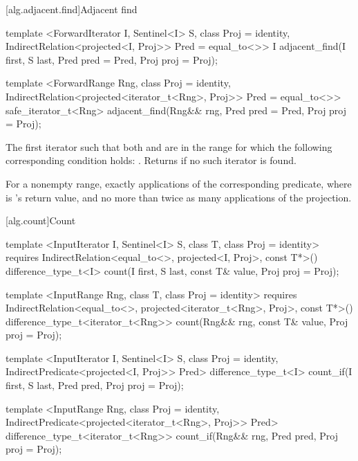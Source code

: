 [alg.adjacent.find]{Adjacent find}

%
\begin{itemdecl}
template <ForwardIterator I, Sentinel<I> S, class Proj = identity,
    IndirectRelation<projected<I, Proj>> Pred = equal_to<>>
  I
    adjacent_find(I first, S last, Pred pred = Pred{},
                  Proj proj = Proj{});

template <ForwardRange Rng, class Proj = identity,
    IndirectRelation<projected<iterator_t<Rng>, Proj>> Pred = equal_to<>>
  safe_iterator_t<Rng>
    adjacent_find(Rng&& rng, Pred pred = Pred{}, Proj proj = Proj{});
\end{itemdecl}

\begin{itemdescr}
\pnum
\returns
The first iterator
such that both
and
are in
the range
for which
the following corresponding condition holds:
.
Returns 
if no such iterator is found.

\pnum
\complexity
For a nonempty range, exactly
applications of the corresponding predicate, where  is
's
return value, and no more than twice as many applications of the projection.
\end{itemdescr}

[alg.count]{Count}

%
%
\begin{itemdecl}
template <InputIterator I, Sentinel<I> S, class T, class Proj = identity>
  requires IndirectRelation<equal_to<>, projected<I, Proj>, const T*>()
  difference_type_t<I>
    count(I first, S last, const T& value, Proj proj = Proj{});

template <InputRange Rng, class T, class Proj = identity>
  requires IndirectRelation<equal_to<>, projected<iterator_t<Rng>, Proj>, const T*>()
  difference_type_t<iterator_t<Rng>>
    count(Rng&& rng, const T& value, Proj proj = Proj{});

template <InputIterator I, Sentinel<I> S, class Proj = identity,
    IndirectPredicate<projected<I, Proj>> Pred>
  difference_type_t<I>
    count_if(I first, S last, Pred pred, Proj proj = Proj{});

template <InputRange Rng, class Proj = identity,
    IndirectPredicate<projected<iterator_t<Rng>, Proj>> Pred>
  difference_type_t<iterator_t<Rng>>
    count_if(Rng&& rng, Pred pred, Proj proj = Proj{});
\end{itemdecl}

